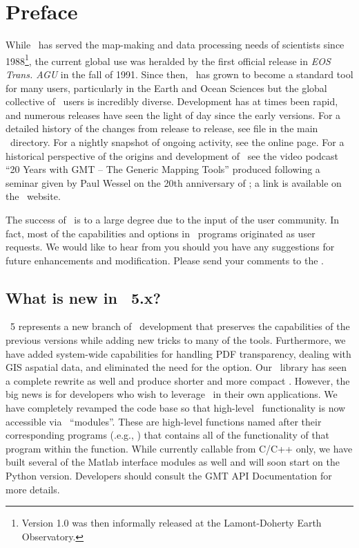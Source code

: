 %
%
\chapter{Preface} 
\label{ch:1}

While \GMT\ has served the map-making and data processing needs of scientists since 1988\footnote{Version
1.0 was then informally released at the Lamont-Doherty Earth Observatory.}, the current global use was
heralded by the first official release in \emph{EOS Trans. AGU} in the fall of 1991.  Since then,
\GMT\ has grown to become a standard tool for many users, particularly in the Earth and Ocean Sciences
but the global collective of \GMT\ users is incredibly diverse.
Development has at times been rapid, and numerous releases have seen the light of day since the early
versions.  For a detailed history of the changes from release to release, see file 
in the main \GMT\ directory.  For a nightly snapshot of ongoing activity, see the online
 page.  For a historical perspective
of the origins and development of \GMT\, see the video podcast ``20 Years with GMT -- The Generic Mapping
Tools'' produced following a seminar given by Paul Wessel on the 20th anniversary of \GMT; a link is available
on the \GMT\ website.

The success of \GMT\ is to a large degree due to the input of the user community. In fact, most of the
capabilities and options in \GMT\ programs originated as user requests.
We would like to hear from you should you have any suggestions for future enhancements and modification.
Please send your comments to the
.

\section{What is new in \gmt\ 5.x?}

\GMT\ 5 represents a new branch of \GMT\ development that preserves the capabilities of the previous
versions while adding new tricks to many of the tools.  Furthermore, we have added system-wide
capabilities for handling PDF transparency, dealing with GIS aspatial data, and eliminated the need
for the  option.  Our \PS\ library  has seen a complete rewrite as well and produce
shorter and more compact \PS.
However, the big news is for developers who wish to leverage \GMT\ in their
own applications.  We have completely revamped the code base so that high-level \GMT\ functionality
is now accessible via \GMT\ ``modules''.  These are high-level functions named after their corresponding
programs (.e.g., ) that contains all of the functionality of that program within
the function.  While currently callable from C/C++ only, we have built several of the Matlab interface
modules as well and will soon start on the Python version.  Developers should consult the GMT API Documentation for more details.

